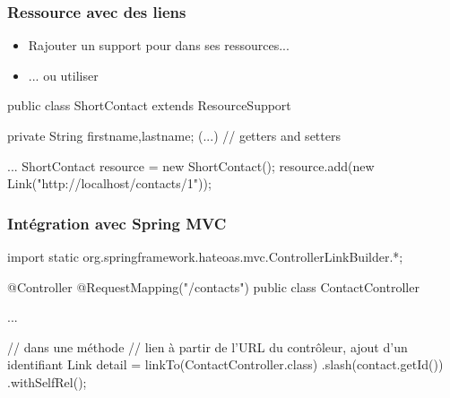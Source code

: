 \begin{frame}[fragile]
 \frametitle{Ressource avec des liens}
 
 \begin{itemize}
  \item Rajouter un support pour  dans ses ressources...
  \item ... ou utiliser 
 \end{itemize}
 
 \begin{javacode}
public class ShortContact extends ResourceSupport {

  private String firstname,lastname;
  (...) // getters and setters
}
...
ShortContact resource = new ShortContact();
resource.add(new Link("http://localhost/contacts/1"));
 \end{javacode}

\end{frame}

\begin{frame}[fragile]
 \frametitle{Intégration avec Spring MVC}

 \begin{javacode}
import static org.springframework.hateoas.mvc.ControllerLinkBuilder.*;

@Controller
@RequestMapping("/contacts")
public class ContactController { 
  ...
  
  // dans une m\'ethode
  // lien \`a partir de l'URL du contr\^oleur, ajout d'un identifiant
  Link detail = linkTo(ContactController.class)
    .slash(contact.getId())
    .withSelfRel();

}
 \end{javacode}

\end{frame} 

